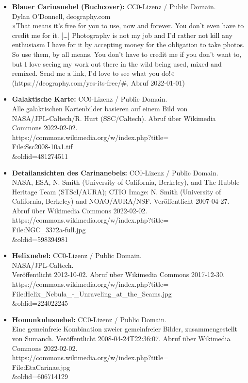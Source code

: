 \begin{itemize}
    \item \textbf{Blauer Carinanebel (Buchcover):} CC0-Lizenz / Public Domain.\\ Dylan O'Donnell, deography.com\\ »That means it’s free for you to use, now and forever. You don’t even have to credit me for it. […] Photography is not my job and I’d rather not kill any enthusiasm I have for it by accepting money for the obligation to take photos. So use them, by all means. You don’t have to credit me if you don’t want to, but I love seeing my work out there in the wild being used, mixed and remixed. Send me a link, I’d love to see what you do!« (https://deography.com/yes-its-free/\#, Abruf 2022-01-01)
    \item \textbf{Galaktische Karte:} CC0-Lizenz / Public Domain.\\ Alle galaktischen Kartenbilder basieren auf einem Bild von\\ NASA/JPL-Caltech/R. Hurt (SSC/Caltech). Abruf über Wikimedia Commons 2022-02-02.\\ https://commons.wikimedia.org/w/index.php?title=\\File:Ssc2008-10a1.tif\\\&oldid=481274511
    \item \textbf{Detailansichten des Carinanebels:} CC0-Lizenz / Public Domain.\\ NASA, ESA, N. Smith (University of California, Berkeley), and The Hubble Heritage Team (STScI/AURA); CTIO Image: N. Smith (University of California, Berkeley) and NOAO/AURA/NSF. Veröffentlicht 2007-04-27. Abruf über Wikimedia Commons 2022-02-02.\\ https://commons.wikimedia.org/w/index.php?title=\\File:NGC\_3372a-full.jpg\\\&oldid=598394981
    \item \textbf{Helixnebel:} CC0-Lizenz / Public Domain.\\ NASA/JPL-Caltech.\\ Veröffentlicht 2012-10-02. Abruf über Wikimedia Commons 2017-12-30.\\ https://commons.wikimedia.org/w/index.php?title=\\File:Helix\_Nebula\_-\_Unraveling\_at\_the\_Seams.jpg\\\&oldid=224022245
    \item \textbf{Homunkulusnebel:} CC0-Lizenz / Public Domain.\\ Eine gemeinfreie Kombination zweier gemeinfreier Bilder, zusammengestellt von Sumanch. Veröffentlicht 2008-04-24T22:36:07. Abruf über Wikimedia Commons 2022-02-02.\\ https://commons.wikimedia.org/w/index.php?title=\\File:EtaCarinae.jpg\\\&oldid=606714129

\end{itemize}
